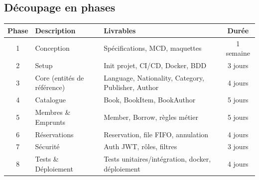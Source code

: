 \documentclass[12pt,a4paper]{article}
\newcommand{\tableheader}[1]{%
  \cellcolor{navy}\color{white}\bfseries #1%
}
\begin{document}
\subsection{D\'ecoupage en phases}
\begin{center}
\begin{tabularx}{\textwidth}{|c|l|X|c|}
\hline
\tableheader{Phase} & \tableheader{Description} & \tableheader{Livrables} & \tableheader{Dur\'ee} \\
\hline
1 & Conception & Sp\'ecifications, MCD, maquettes & 1 semaine \\
2 & Setup & Init projet, CI/CD, Docker, BDD & 3 jours \\
3 & Core (entit\'es de r\'ef\'erence) & Language, Nationality, Category, Publisher, Author & 4 jours \\
4 & Catalogue & Book, BookItem, BookAuthor & 5 jours \\
5 & Membres \& Emprunts & Member, Borrow, r\`egles m\'etier & 5 jours \\
6 & R\'eservations & Reservation, file FIFO, annulation & 4 jours \\
7 & S\'ecurit\'e & Auth JWT, r\^oles, filtres & 3 jours \\
8 & Tests \& D\'eploiement & Tests unitaires/int\'egration, docker, d\'eploiement & 4 jours \\
\hline
\end{tabularx}
\end{center}
\end{document}
